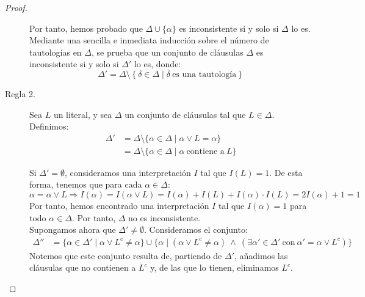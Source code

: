 \documentclass[12pt]{article}
\begin{document}
\begin{ejercicio}
\begin{proof}
\begin{description}
                Por tanto, hemos probado que $\Delta\cup \{\alpha\}$ es inconsistente si y solo si $\Delta$ lo es.\\

                Mediante una sencilla e inmediata inducción sobre el número de tautologías en $\Delta$, se prueba que un conjunto de cláusulas $\Delta$ es inconsistente si y solo si $\Delta'$ lo es, donde:
                \begin{equation*}
                    \Delta'=\Delta\setminus \left\{\delta\in \Delta\mid \delta\ \text{es una tautología}\right\}
                \end{equation*}

                \item[Regla 2.] Sea $L$ un literal, y sea $\Delta$ un conjunto de cláusulas tal que $L\in \Delta$.
                Definimos:
                \begin{align*}
                    \Delta'&= \Delta\setminus \{\alpha\in \Delta \mid \alpha\lor L=\alpha\}\\
                    &= \Delta\setminus \{\alpha\in \Delta \mid \alpha\ \text{contiene a}\ L\}
                \end{align*}

                Si $\Delta'=\emptyset$, consideramos una interpretación $I$ tal que $I(L)=1$.
                De esta forma, tenemos que para cada $\alpha\in \Delta$:
                \begin{equation*}
                    \alpha=\alpha\lor L
                    \Longrightarrow
                    I(\alpha)=I(\alpha\lor L)=I(\alpha)+I(L)+I(\alpha)\cdot I(L)=2I(\alpha)+1=1
                \end{equation*}
                Por tanto, hemos encontrado una interpretación $I$ tal que $I(\alpha)=1$ para todo $\alpha\in \Delta$. Por tanto, $\Delta$ no es inconsistente.\\

                Supongamos ahora que $\Delta'\neq \emptyset$. Consideramos el conjunto:
                \begin{align*}
                    \Delta''&= \{ \alpha\in \Delta' \mid \alpha\lor L^c\neq \alpha\} \cup \{ \alpha\mid (\alpha\lor L^c\neq \alpha) \ \land \ (\exists \alpha'\in \Delta'\ \text{con}\ \alpha'=\alpha\lor L^c)\}
                \end{align*}
                Notemos que este conjunto resulta de, partiendo de $\Delta'$, añadimos las cláusulas que no contienen a $L^c$ y, de las que lo tienen, eliminamos $L^c$.


\end{description}
\end{proof}
\end{ejercicio}
\end{document}

